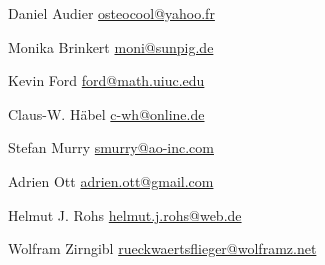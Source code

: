 \item Daniel Audier \url{osteocool@yahoo.fr}
\item Monika Brinkert \url{moni@sunpig.de}
\item Kevin Ford \url{ford@math.uiuc.edu}
\item Claus-W. Häbel \url{c-wh@online.de}
\item Stefan Murry \url{smurry@ao-inc.com}
\item Adrien Ott \url{adrien.ott@gmail.com}
\item Helmut J. Rohs \url{helmut.j.rohs@web.de}
\item Wolfram Zirngibl \url{rueckwaertsflieger@wolframz.net}

